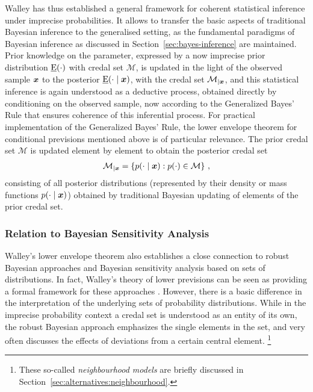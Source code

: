 Walley has thus established a general framework for coherent statistical inference under imprecise probabilities.
It allows to transfer the basic aspects of traditional Bayesian inference to the generalised setting,
as the fundamental paradigms of Bayesian inference as discussed in Section~\ref{sec:bayes-inference} are maintained.
Prior knowledge on the parameter, expressed by a now imprecise prior distribution $\underline{\operatorname{E}}(\cdot)$ with credal set $\mathcal{M}$,
is updated in the light of the observed sample ${\bm x}$ to the posterior $\underline{\operatorname{E}}(\cdot \mid {\bm x})$,
with the credal set $\mathcal{M}_{\vert {\bm x}}$,
and this statistical inference is again understood as a deductive process,
obtained directly by conditioning on the observed sample,
now according to the Generalized Bayes' Rule that ensures coherence of this inferential process.
For practical implementation of the Generalized Bayes' Rule, the lower envelope theorem for conditional 
previsions mentioned above %
is of particular relevance.
The prior credal set $\mathcal{M}$ is updated element by element to obtain the posterior credal set %
\begin{align}
\label{eq:posteriorcredalset}
\mathcal{M}_{\vert {\bm x}} = \left\{ p(\cdot \mid {\bm x}) :  p(\cdot) \in \mathcal{M} \right\}\,,
\end{align}
consisting of all posterior distributions (represented by their density or mass functions $p(\cdot \mid {\bm x})$)
obtained by traditional Bayesian updating of elements of the prior credal set.

\subsubsection{Relation to Bayesian Sensitivity Analysis}
\label{sec:bayesiansensitivity}

Walley's lower envelope theorem also establishes a close connection to robust Bayesian approaches and Bayesian sensitivity analysis
\parencite[see, e.g.,][]{1994:berger, 2000:rios, 2005:ruggeri} based on sets of distributions.
In fact, Walley's theory of lower previsions can be seen as
providing a formal framework for these approaches \parencite[see, e.g.,][\S 1.1]{1994:berger}.
However, there is a basic difference in the interpretation of the underlying sets of probability distributions.
While in the imprecise probability context a credal set is understood as an entity of its own,
the robust Bayesian approach emphasizes the single elements in the set,
and very often discusses the effects of deviations from a certain central element.%
\footnote{These so-called \emph{neighbourhood models} are briefly discussed in Section~\ref{sec:alternatives:neighbourhood}.}

